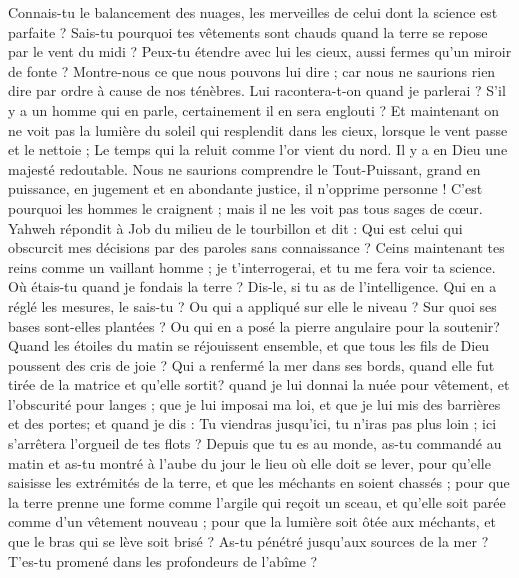 \begin{multicols}{2}
Connais-tu le balancement des nuages, les merveilles de celui dont la science est parfaite ?
Sais-tu pourquoi tes vêtements sont chauds quand la terre se repose par le vent du midi ?
Peux-tu étendre avec lui les cieux, aussi fermes qu'un miroir de fonte ?
Montre-nous ce que nous pouvons lui dire ; car nous ne saurions rien dire par ordre à cause de nos ténèbres. 
Lui racontera-t-on quand je parlerai ? S'il y a un homme qui en parle, certainement il en sera englouti ?
Et maintenant on ne voit pas la lumière du soleil qui resplendit dans les cieux, lorsque le vent passe et le nettoie ;
Le temps qui la reluit comme l'or vient du nord. Il y a en Dieu une majesté redoutable.
Nous ne saurions comprendre le Tout-Puissant, grand en puissance, en jugement et en abondante justice, il n'opprime personne !
C'est pourquoi les hommes le craignent ; mais il ne les voit pas tous sages de cœur.
\VerseOne{}Yahweh répondit à Job du milieu de le tourbillon et dit :
Qui est celui qui obscurcit mes décisions par des paroles sans connaissance ?
Ceins maintenant tes reins comme un vaillant homme ; je t'interrogerai, et tu me fera voir ta science.
Où étais-tu quand je fondais la terre ? Dis-le, si tu as de l'intelligence.
Qui en a réglé les mesures, le sais-tu ? Ou qui a appliqué sur elle le niveau ?
Sur quoi ses bases sont-elles plantées ? Ou qui en a posé la pierre angulaire pour la soutenir?
Quand les étoiles du matin se réjouissent ensemble, et que tous les fils de Dieu poussent des cris de joie  ?
Qui a renfermé la mer dans ses bords, quand elle fut tirée de la matrice et qu'elle sortit? 
quand je lui donnai la nuée pour vêtement, et l'obscurité pour langes ;
que je lui imposai ma loi, et que je lui mis des barrières et des portes;
 et quand je dis : Tu viendras jusqu'ici, tu n'iras pas plus loin ; ici s'arrêtera l'orgueil de tes flots ?
Depuis que tu es au monde, as-tu commandé au matin et as-tu montré à l'aube du jour le lieu où elle doit se lever,
pour qu'elle saisisse les extrémités de la terre, et que les méchants en soient chassés ;
pour que la terre prenne une forme comme l'argile qui reçoit un sceau, et qu'elle soit parée comme d'un vêtement nouveau ;
pour que la lumière soit ôtée aux méchants, et que le bras qui se lève soit brisé ?
As-tu pénétré jusqu'aux sources de la mer ? T'es-tu promené dans les profondeurs de l'abîme ?

\end{multicols}
